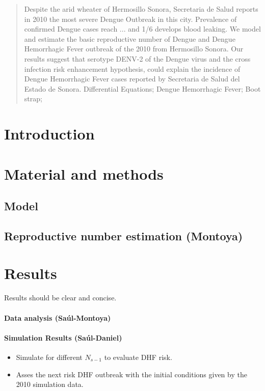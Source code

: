 \documentclass[11pt]{imammb}
\numberwithin{equation}{section}
\begin{document}
    \begin{abstract}
        {
        Despite the arid wheater of Hermosillo Sonora, Secretaria de Salud
        reports in 2010 the most severe Dengue Outbreak in this city. Prevalence of
        confirmed Dengue cases reach ... and 1/6 develops blood leaking.
            We model and estimate the basic reproductive number of Dengue  and
        Dengue Hemorrhagic Fever outbreak of the 2010 from Hermosillo Sonora.
        Our results suggest that serotype DENV-2 of the Dengue virus and the cross
        infection risk enhancement hypothesis, could explain the incidence of
        Dengue Hemorrhagic Fever cases reported by Secretaria de Salud del Estado de
        Sonora.}
        {Differential Equations;
        Dengue Hemorrhagic Fever;
        Boot strap;}
    \end{abstract}
%
%
    \section{Introduction} \label{sec:Intro}
        
    \section{Material and methods}
        
        \subsection*{Model}
            
            
            
        \subsection{Reproductive number estimation (Montoya)}
    \section{Results}
        Results should be clear and concise.
        \paragraph{Data analysis (Saúl-Montoya)}
        \paragraph{Simulation Results (Saúl-Daniel)}
            \begin{itemize}
                \item 
                    Simulate for different $N_{s-1}$ 
                    to evaluate DHF risk.
                \item
                    Asses the next risk DHF outbreak 
                with the initial conditions given by 
                the 2010 simulation data.
            \end{itemize}
\end{document}
